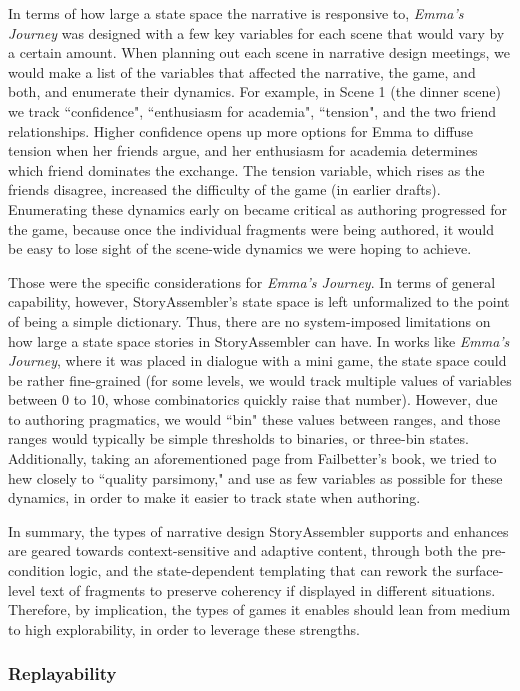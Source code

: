 In terms of how large a state space the narrative is responsive to, \textit{Emma's Journey} was designed with a few key variables for each scene that would vary by a certain amount. When planning out each scene in narrative design meetings, we would make a list of the variables that affected the narrative, the game, and both, and enumerate their dynamics. For example, in Scene 1 (the dinner scene) we track ``confidence", ``enthusiasm for academia", ``tension", and the two friend relationships. Higher confidence opens up more options for Emma to diffuse tension when her friends argue, and her enthusiasm for academia determines which friend dominates the exchange. The tension variable, which rises as the friends disagree, increased the difficulty of the game (in earlier drafts). Enumerating these dynamics early on became critical as authoring progressed for the game, because once the individual fragments were being authored, it would be easy to lose sight of the scene-wide dynamics we were hoping to achieve.

Those were the specific considerations for \textit{Emma's Journey}. In terms of general capability, however, StoryAssembler's state space is left unformalized to the point of being a simple dictionary. Thus, there are no system-imposed limitations on how large a state space stories in StoryAssembler can have. In works like \textit{Emma's Journey}, where it was placed in dialogue with a mini game, the state space could be rather fine-grained (for some levels, we would track multiple values of variables between 0 to 10, whose combinatorics quickly raise that number). However, due to authoring pragmatics, we would ``bin" these values between ranges, and those ranges would typically be simple thresholds to binaries, or three-bin states. Additionally, taking an aforementioned page from Failbetter's book, we tried to hew closely to ``quality parsimony," and use as few variables as possible for these dynamics, in order to make it easier to track state when authoring.

In summary, the types of narrative design StoryAssembler supports and enhances are geared towards context-sensitive and adaptive content, through both the pre-condition logic, and the state-dependent templating that can rework the surface-level text of fragments to preserve coherency if displayed in different situations. Therefore, by implication, the types of games it enables should lean from medium to high explorability, in order to leverage these strengths.

\subsubsection{Replayability}

